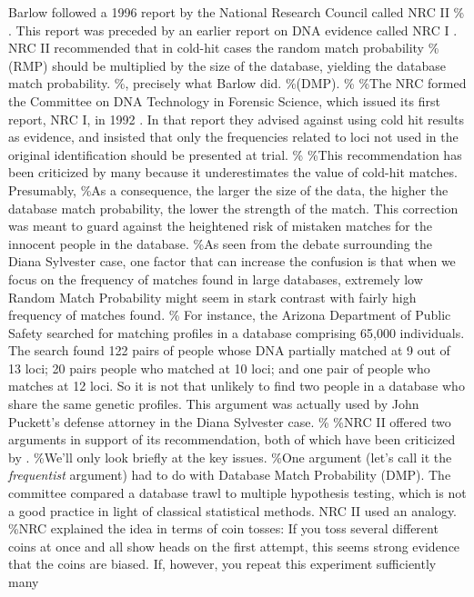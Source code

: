 \documentclass[10pt,dvipsnames,enabledeprecatedfontcommands]{scrartcl}
\begin{document}
Barlow followed a 1996 report by the National Research Council called
NRC II \%
\citep{NRCII1996}. This report was preceded by an earlier report on DNA
evidence called NRC I \citep{NRCI1992}. NRC II recommended that in
cold-hit cases the random match probability \%(RMP) should be multiplied
by the size of the database, yielding the database match probability.
\%, precisely what Barlow did. \%(DMP). \% \%The NRC formed the
Committee on DNA Technology in Forensic Science, which issued its first
report, NRC I, in 1992 . In that report they advised against using cold
hit results as evidence, and insisted that only the frequencies related
to loci not used in the original identification should be presented at
trial. \% \%This recommendation has been criticized by many because it
underestimates the value of cold-hit matches. Presumably, \%As a
consequence, the larger the size of the data, the higher the database
match probability, the lower the strength of the match. This correction
was meant to guard against the heightened risk of mistaken matches for
the innocent people in the database. \%As seen from the debate
surrounding the Diana Sylvester case, one factor that can increase the
confusion is that when we focus on the frequency of matches found in
large databases, extremely low Random Match Probability might seem in
stark contrast with fairly high frequency of matches found. \% For
instance, the Arizona Department of Public Safety searched for matching
profiles in a database comprising 65,000 individuals. The search found
122 pairs of people whose DNA partially matched at 9 out of 13 loci; 20
pairs people who matched at 10 loci; and one pair of people who matches
at 12 loci. So it is not that unlikely to find two people in a database
who share the same genetic profiles. This argument was actually used by
John Puckett's defense attorney in the Diana Sylvester case. \% \%NRC II
offered two arguments in support of its recommendation, both of which
have been criticized by \citet{donnelly1999DNADatabaseSearches}. \%We'll
only look briefly at the key issues. \%One argument (let's call it the
\emph{frequentist} argument) had to do with Database Match Probability
(DMP). The committee compared a database trawl to multiple hypothesis
testing, which is not a good practice in light of classical statistical
methods. NRC II used an analogy. \%NRC explained the idea in terms of
coin tosses: If you toss several different coins at once and all show
heads on the first attempt, this seems strong evidence that the coins
are biased. If, however, you repeat this experiment sufficiently many
\end{document}
